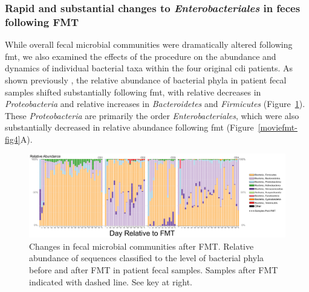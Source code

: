 \subsubsection{Rapid and substantial changes to \textit{Enterobacteriales} in feces following FMT}

While overall fecal microbial communities were dramatically altered following \gls{fmt}, we also examined the effects of the procedure on the abundance and dynamics of individual bacterial taxa within the four original \gls{cdi} patients. As shown previously \cite{RN53moviefmt, RN30, RN66, RN31, RN36, RN4129, RN1}, the relative abundance of bacterial phyla in patient fecal samples shifted substantially following \gls{fmt}, with relative decreases in \textit{Proteobacteria} and relative increases in \textit{Bacteroidetes} and \textit{Firmicutes} (Figure~\ref{moviefmt-fig3}). These \textit{Proteobacteria} are primarily the order \textit{Enterobacteriales}, which were also substantially decreased in relative abundance following \gls{fmt} (Figure~\ref{moviefmt-fig4}A).

\begin{figure}
\includegraphics[width=\textheight]{moviefmt-figures/figure-3}
\caption[Changes in fecal microbial communities after FMT.]{Changes in fecal microbial communities after FMT. Relative abundance of sequences classified to the level of bacterial phyla before and after FMT in patient fecal samples. Samples after FMT indicated with dashed line. See key at right.}
\label{moviefmt-fig3}
\end{figure}

